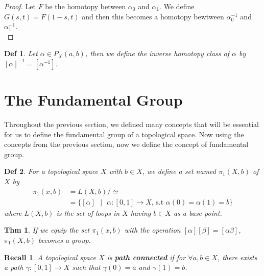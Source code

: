 \documentclass[paper=a4, fontsize=11pt]{scrartcl}
\newtheorem{theorem}{Thm}
\newtheorem{definition}{Def}
\newtheorem*{recall}{Recall}
\begin{document}
\begin{proof}
	Let $F$ be the homotopy between $\alpha_0$ and $\alpha_1$. We define $G(s,t)=F(1-s,t)$ and then this becomes a homotopy bewtween  $\alpha_0^{-1}$ and $\alpha_1^{-1}$. \\
\end{proof}

\begin{definition}
	Let $\alpha \in P_X(a,b)$, then we define the inverse homotopy class of $\alpha$ by $[\alpha]^{-1} = [\alpha^{-1}]$.\\
\end{definition}


\section{The Fundamental Group}
\vspace{0.15in}
Throughout the previous section, we defined many concepts that will be essential for us to define the fundamental group of a topological space. Now using the concepts from the previous section, now we define the concept of fundamental group.\\

\begin{definition}
	For a topological space $X$ with $b \in X$, we define a set named $\pi_1(X,b)$ of $X$ by
	\begin{equation}\nonumber
		\begin{split}
		\pi_1(x,b) &= L(X,b)/\simeq\\
		&= \{[\alpha] \text{ }|\text{ } \alpha : [0,1] \to X \text{, s.t } \alpha(0)=\alpha(1)=b\}
		\end{split}
	\end{equation}
	where $L(X,b)$ is the set of loops in $X$ having $b \in X$ as a base point.\\
\end{definition}

\begin{theorem}
	If we equip the set $\pi_1(x,b)$ with the operation $[\alpha][\beta]=[\alpha\beta]$, $\pi_1(X,b)$ becomes a group.\\
\end{theorem}

\begin{recall}
	A topological space $X$ is \textbf{path connected} if for $\forall a,b \in X$, there exists a path $\gamma:[0,1]\to X$ such that $\gamma(0)=a$ and $\gamma(1)=b$.\\
\end{recall}
\end{document}
